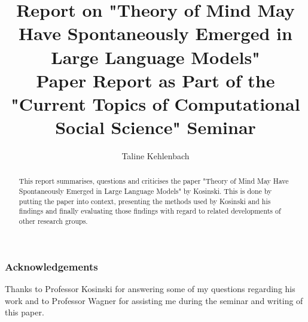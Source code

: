 \documentclass[runningheads]{llncs}
\begin{document}
%
\title{\large Report on "Theory of Mind May Have Spontaneously Emerged in Large Language Models" \\
\normalsize Paper Report as Part of the "Current Topics of Computational Social Science" Seminar}

%
%
\author{Taline Kehlenbach}
%
%
%
\maketitle              %
%
\begin{abstract}
This report summarises, questions and criticises the paper "Theory of Mind May Have Spontaneously Emerged in Large Language Models" by Kosinski. This is done by putting the paper into context, presenting the methods used by Kosinski and his findings and finally evaluating those findings with regard to related developments of other research groups.

\end{abstract}
%
%
%















\subsubsection{Acknowledgements} Thanks to Professor Kosinski for answering some of my questions regarding his work and to Professor Wagner for assisting me during the seminar and writing of this paper.

%
%
%

%


\end{document}
